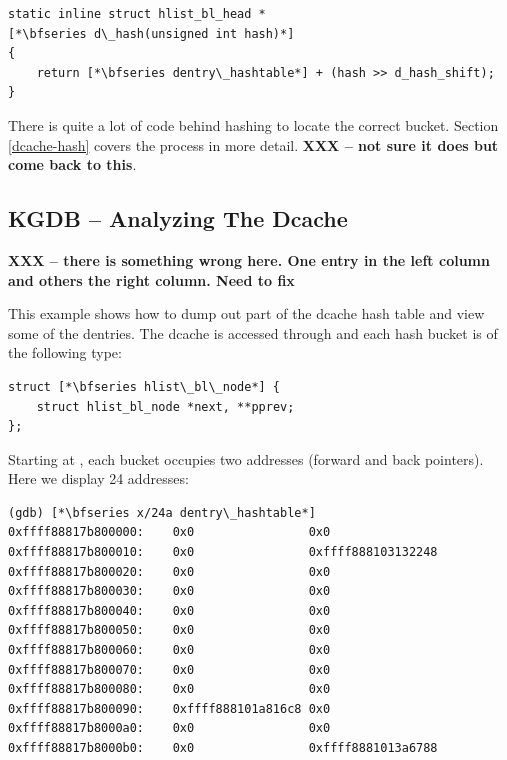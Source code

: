 \begin{lstlisting}
static inline struct hlist_bl_head *
[*\bfseries d\_hash(unsigned int hash)*]
{
    return [*\bfseries dentry\_hashtable*] + (hash >> d_hash_shift);
}
\end{lstlisting}

\noindent
There is quite a lot of code behind hashing to locate the correct bucket. Section \ref{dcache-hash} covers the process in more detail. \textbf{XXX -- not sure it does but come back to this}.


\subsection{KGDB -- Analyzing The Dcache}

\textbf{XXX -- there is something wrong here. One entry in the left column and others the right column. Need to fix}

This example shows how to dump out part of the dcache hash table and view some of the dentries. The dcache is accessed through  and each hash bucket is of the following type:

\begin{lstlisting}
struct [*\bfseries hlist\_bl\_node*] {
    struct hlist_bl_node *next, **pprev;
};
\end{lstlisting}

\noindent
Starting at , each bucket occupies two addresses (forward and back pointers). Here we display 24 addresses:

\begin{lstlisting}
(gdb) [*\bfseries x/24a dentry\_hashtable*]
0xffff88817b800000:    0x0                0x0     
0xffff88817b800010:    0x0                0xffff888103132248
0xffff88817b800020:    0x0                0x0
0xffff88817b800030:    0x0                0x0 
0xffff88817b800040:    0x0                0x0
0xffff88817b800050:    0x0                0x0 
0xffff88817b800060:    0x0                0x0
0xffff88817b800070:    0x0                0x0
0xffff88817b800080:    0x0                0x0
0xffff88817b800090:    0xffff888101a816c8 0x0
0xffff88817b8000a0:    0x0                0x0
0xffff88817b8000b0:    0x0                0xffff8881013a6788
\end{lstlisting}

